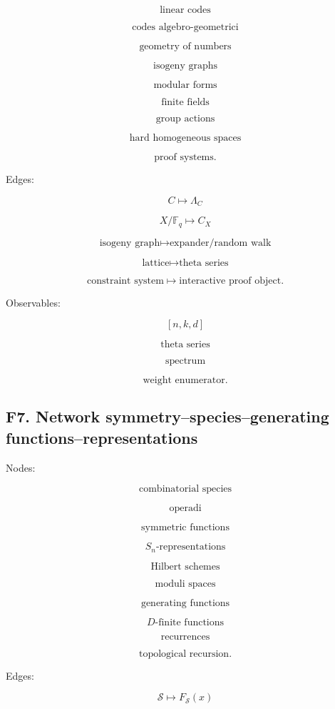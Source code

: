 \documentclass[11pt]{article}
\begin{document}
\[
\text{linear codes}
\]

\[
\text{codes algebro-geometrici}
\]

\[
\text{geometry of numbers}
\]

\[
\text{isogeny graphs}
\]

\[
\text{modular forms}
\]

\[
\text{finite fields}
\]

\[
\text{group actions}
\]

\[
\text{hard homogeneous spaces}
\]

\[
\text{proof systems}.
\]

Edges:

\[
C\mapsto \Lambda_C
\]

\[
X/\mathbb F_q\mapsto C_X
\]

\[
\text{isogeny graph}\mapsto \text{expander/random walk}
\]

\[
\text{lattice}\mapsto \text{theta series}
\]

\[
\text{constraint system}\mapsto \text{interactive proof object}.
\]

Observables:

\[
[n,k,d]
\]

\[
\text{theta series}
\]

\[
\text{spectrum}
\]

\[
\text{weight enumerator}.
\]



\subsection{F7. Network symmetry--species--generating functions--representations}

Nodes:

\[
\text{combinatorial species}
\]

\[
\text{operadi}
\]

\[
\text{symmetric functions}
\]

\[
S_n\text{-representations}
\]

\[
\text{Hilbert schemes}
\]

\[
\text{moduli spaces}
\]

\[
\text{generating functions}
\]

\[
D\text{-finite functions}
\]

\[
\text{recurrences}
\]

\[
\text{topological recursion}.
\]

Edges:

\[
\mathcal S\mapsto F_{\mathcal S}(x)
\]
\end{document}
